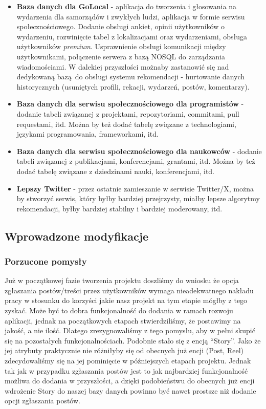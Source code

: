 \documentclass{article}
\begin{document}
\begin{itemize}
    \item \textbf{Baza danych dla GoLocal} - aplikacja do tworzenia i głosowania na wydarzenia dla samorządów i zwykłych ludzi, aplikacja w formie serwisu społecznościowego. Dodanie obsługi ankiet, opinii użytkowników o wydarzeniu, rozwinięcie tabel z lokalizacjami oraz wydarzeniami, obsługa użytkowników \textit{premium}. Usprawnienie obsługi komunikacji między użytkownikami, połączenie serwera z bazą NOSQL do zarządzania wiadomościami. W dalekiej przyszłości możnaby zastanowić się nad dedykowaną bazą do obsługi systemu rekomendacji - hurtowanie danych historycznych (usuniętych profili, rekacji, wydarzeń, postów, komentarzy).
    \item \textbf{Baza danych dla serwisu społecznościowego dla programistów} - dodanie tabeli związanej z projektami, repozytoriami, commitami, pull requestami, itd. Można by też dodać tabelę związane z technologiami, językami programowania, frameworkami, itd.
    \item \textbf{Baza danych dla serwisu społecznościowego dla naukowców} - dodanie tabeli związanej z publikacjami, konferencjami, grantami, itd. Można by też dodać tabelę związane z dziedzinami nauki, konferencjami, itd.
    \item \textbf{Lepszy Twitter} - przez ostatnie zamieszanie w serwisie Twitter/X, można by stworzyć serwis, który byłby bardziej przejrzysty, miałby lepsze algorytmy rekomendacji, byłby bardziej stabilny i bardziej moderowany, itd.
\end{itemize}

\subsection{Wprowadzone modyfikacje}

\subsubsection{Porzucone pomysły}
Już w początkowej fazie tworzenia projektu doszliśmy do wniosku że opcja zgłaszania postów/treści przez użytkowników wymaga nieadekwatnego nakładu pracy w stosunku do korzyści jakie nasz projekt na tym etapie mógłby z tego zyskać. Może być to dobra funkcjonalność do dodania w ramach rozwoju aplikacji, jednak na początkowych etapach stwierdziliśmy, że postawimy na jakość, a nie ilość. Dlatego zrezygnowaliśmy z tego pomysłu, aby w pełni skupić się na pozostałych funkcjonalnościach.
Podobnie stało się z encją “Story”. Jako że jej atrybuty praktycznie nie różniłyby się od obecnych już encji (Post, Reel) zdecydowaliśmy się na jej pominięcie w późniejszych etapach projektu. Jednak tak jak w przypadku zgłaszania postów jest to jak najbardziej funkcjonalność możliwa do dodania w przyszłości, a dzięki podobieństwu do obecnych już encji wdrożenie Story do naszej bazy danych powinno być nawet prostsze niż dodanie opcji zgłaszania postów.
\end{document}
